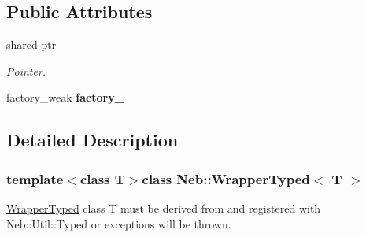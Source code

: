 \subsection*{\-Public \-Attributes}
\begin{DoxyCompactItemize}
\item 
\hypertarget{classNeb_1_1WrapperTyped_a92ba07879ca9c2072d7dd2b5acb9d7f5}{shared \hyperlink{classNeb_1_1WrapperTyped_a92ba07879ca9c2072d7dd2b5acb9d7f5}{ptr\-\_\-}}\label{classNeb_1_1WrapperTyped_a92ba07879ca9c2072d7dd2b5acb9d7f5}

\begin{DoxyCompactList}\small\item\em \-Pointer. \end{DoxyCompactList}\item 
\hypertarget{classNeb_1_1WrapperTyped_abd7867968e08d0ea4e3d681715e6684d}{factory\-\_\-weak {\bfseries factory\-\_\-}}\label{classNeb_1_1WrapperTyped_abd7867968e08d0ea4e3d681715e6684d}

\end{DoxyCompactItemize}


\subsection{\-Detailed \-Description}
\subsubsection*{template$<$class \-T$>$class Neb\-::\-Wrapper\-Typed$<$ T $>$}

\hyperlink{classNeb_1_1WrapperTyped}{\-Wrapper\-Typed} class \-T must be derived from and registered with \-Neb\-::\-Util\-::\-Typed or exceptions will be thrown. 

